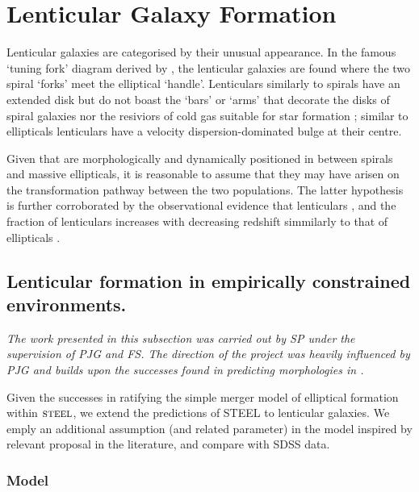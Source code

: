 \section{Lenticular Galaxy Formation}
Lenticular galaxies are categorised by their unusual appearance. In the famous `tuning fork' diagram derived by \citet{Hubble1927TheNebulae}, the lenticular galaxies are found where the two spiral `forks' meet the elliptical `handle'. Lenticulars similarly to spirals have an extended disk but do not boast the `bars' or `arms' that decorate the disks of spiral galaxies nor the resiviors of cold gas suitable for star formation \cite{CHAMARAUX1986TheSamples}; similar to ellipticals lenticulars have a velocity dispersion-dominated bulge at their centre. 

Given that are morphologically and dynamically positioned in between spirals and massive ellipticals, it is reasonable to assume that they may have arisen on the transformation pathway between the two populations. The latter hypothesis is further corroborated by the observational evidence that lenticulars \cite{Dressler1980GalaxyGalaxies}, and the fraction of lenticulars increases with decreasing redshift simmilarly to that of ellipticals \cite{Postman2005TheClusters}. 

\subsection{Lenticular formation in empirically constrained environments.}
\textit{The work presented in this subsection was carried out by SP under the supervision of PJG and FS. The direction of the project was heavily influenced by PJG and builds upon the successes found in predicting morphologies in \steel.}

Given the successes in ratifying the simple merger model of elliptical formation within $\textsc{steel}$, we extend the predictions of STEEL to lenticular galaxies. We emply an additional assumption (and related parameter) in the model inspired by relevant proposal in the literature, and compare with SDSS data.

\subsubsection{\citet{Cook2009Two-phaseFormation} Model}

